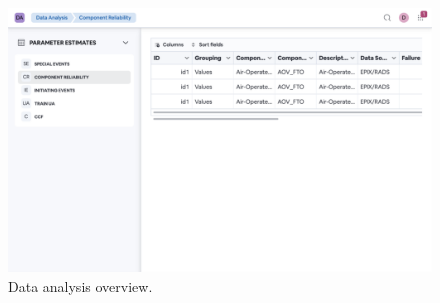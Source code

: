 \begin{figure}
  \centering
  \includegraphics[width=1.0\textwidth]{4_proposed_solution/web_app/figures/data_analysis.png}
  \caption{Data analysis overview.}
  \label{fig:data_analysis}
\end{figure}